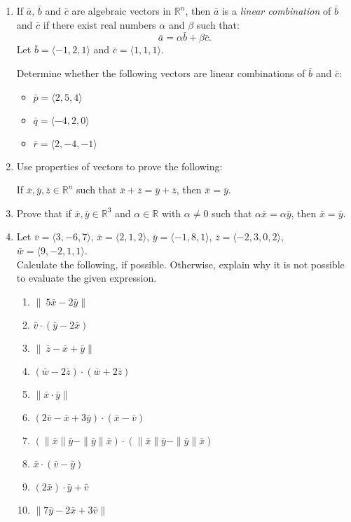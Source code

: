 \begin{exercisebox}
\begin{enumerate}[label=\arabic*., series=exercises]
\item If $\bar{a}$, $\bar{b}$ and $\bar{c}$ are algebraic vectors in $\mathbb{R}^n$, then $\bar{a}$ is a \textit{linear combination} of $\bar{b}$ and $\bar{c}$ if there exist real numbers $\alpha$ and $\beta$ such that:
\[
\bar{a} = \alpha \bar{b} + \beta \bar{c}.
\]
Let $\bar{b} = \langle -1, 2, 1 \rangle$ and $\bar{c} = \langle 1, 1, 1 \rangle$.

Determine whether the following vectors are linear combinations of $\bar{b}$ and $\bar{c}$:
\begin{multicols}{3}
\begin{itemize}
\item $\bar{p} = \langle 2, 5, 4 \rangle$
\item $\bar{q} = \langle -4, 2, 0 \rangle$
\item $\bar{r} = \langle 2, -4, -1 \rangle$
\end{itemize}
\end{multicols}

\item Use properties of vectors to prove the following:

If $\bar{x}, \bar{y}, \bar{z} \in \mathbb{R}^n$ such that $\bar{x} + \bar{z} = \bar{y} + \bar{z}$, then $\bar{x} = \bar{y}$.

\item Prove that if $\bar{x}, \bar{y} \in \mathbb{R}^3$ and $\alpha \in \mathbb{R}$ with $\alpha \neq 0$ such that $\alpha \bar{x} = \alpha \bar{y}$, then $\bar{x} = \bar{y}$.

\item Let $\bar{v} = \langle 3,-6,7 \rangle$, $\bar{x} = \langle 2,1,2 \rangle$, $\bar{y} = \langle -1,8,1 \rangle$, $\bar{z} = \langle -2,3,0,2 \rangle$, $\bar{w} = \langle 9,-2,1,1 \rangle$. \\
Calculate the following, if possible. Otherwise, explain why it is not possible to evaluate the given expression.

\begin{multicols}{2}
\begin{enumerate}[label=(\alph*)]
\item $\|\ 5\bar{x} - 2\bar{y} \|$
\item $\bar{v} \cdot (\bar{y} - 2\bar{x})$
\item $\|\ \bar{z} - \bar{x} + \bar{y} \|$
\item $(\bar{w} - 2\bar{z}) \cdot (\bar{w} + 2\bar{z})$
\item $\| \bar{x} \cdot \bar{y} \|$
\item $(2\bar{v} - \bar{x} + 3\bar{y}) \cdot (\bar{x} - \bar{v})$
\item $(\|\bar{x}\|\bar{y} - \|\bar{y}\|\bar{x}) \cdot (\|\bar{x}\|\bar{y} - \|\bar{y}\|\bar{x})$
\item $\bar{x} \cdot (\bar{v} - \bar{y})$
\item $(2\bar{x}) \cdot \bar{y} + \bar{v}$
\item $\| 7\bar{y} - 2\bar{x} + 3\bar{v} \|$
\end{enumerate}
\end{multicols}


\end{enumerate}
\end{exercisebox}

